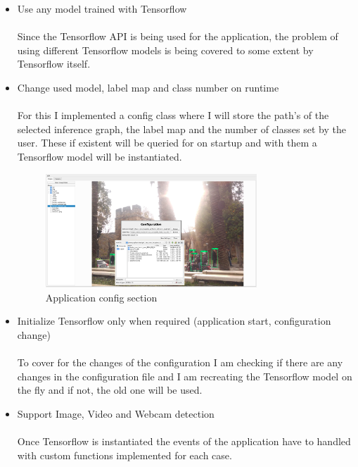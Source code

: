 \begin{itemize}
    \item Use any model trained with Tensorflow \\ \\
        Since the Tensorflow API is being used for the application, the problem of using different Tensorflow models is being covered to
        some extent by Tensorflow itself.
    \newpage \noindent
    \item Change used model, label map and class number on runtime \\ \\
        For this I implemented a config class where I will store the path's of the selected inference graph, the label map and the
        number of classes set by the user. These if existent will be queried for on startup and with them a Tensorflow model will be instantiated.\\
        \begin{figure}[H]
            \begin{center}
                \includegraphics[width=0.75\textwidth]{images/application/application_config.png}
            \end{center}
            \caption{Application config section}
        \end{figure}
    \item Initialize Tensorflow only when required (application start, configuration change)\\ \\
        To cover for the changes of the configuration I am checking if there are any changes in the configuration file and I am recreating the
        Tensorflow model on the fly and if not, the old one will be used.
    \item Support Image, Video and Webcam detection \\ \\
        Once Tensorflow is instantiated the events of the application have to handled with custom functions implemented for each case.

\end{itemize}
